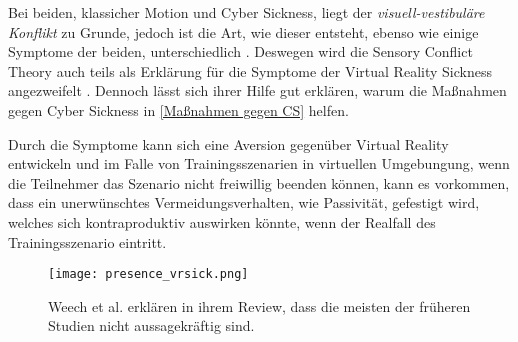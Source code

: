 Bei beiden, klassicher Motion und Cyber Sickness, liegt der \textit{visuell-vestibul\"are Konflikt} zu Grunde, jedoch ist die Art, wie dieser entsteht, ebenso wie einige Symptome der beiden, unterschiedlich \cite{Stanney:1997:MSCSSS}. Deswegen wird die Sensory Conflict Theory auch teils als Erkl\"arung f\"ur die Symptome der Virtual Reality Sickness angezweifelt  \cite{Kolasinski:1998:SympCS}. Dennoch l\"asst sich ihrer Hilfe gut erkl\"aren, warum die Ma{\ss}nahmen gegen Cyber Sickness in  \autoref{Maßnahmen gegen CS} helfen.

Durch die Symptome kann sich eine Aversion gegenüber Virtual Reality entwickeln und im Falle von Trainingsszenarien in virtuellen Umgebungung, wenn die Teilnehmer das Szenario nicht freiwillig beenden können, kann es vorkommen, dass ein unerwünschtes Vermeidungsverhalten, wie Passivit\"at, gefestigt wird\cite{Crowley:1987:Avoid}, welches sich kontraproduktiv auswirken könnte, wenn der Realfall des Trainingsszenario eintritt.




\begin{figure}[bt]
	\centering 
	\texttt{[image: presence\_vrsick.png]}
	\caption{Weech et al.\cite{Weech:2019:PresenceCS} erkl\"aren in ihrem Review, dass die meisten der fr\"uheren Studien nicht aussagekr\"aftig sind.}
	\label{abb:presence_vrsick}
\end{figure}

